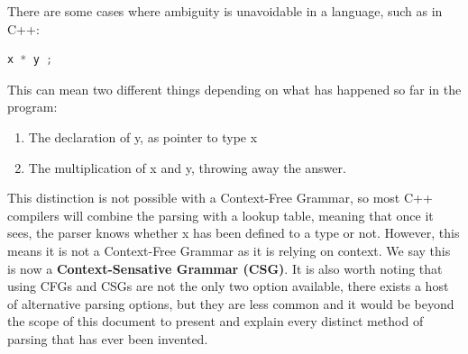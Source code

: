 \documentclass[ %
                    author={Jonathan Rankin},
                supervisor={Dr. David May, Dr. Ian Holyer},
                    degree={MEng},
                     title={CodeTouch},
                  subtitle={A Revolutionary Way To Program Real Code On Touch Screen Devices},
                      type={enterprise},
                      year={2015 } ]{dissertation}
\begin{document}
There are some cases where ambiguity is unavoidable in a language, such as in C++:

\begin{lstlisting}[language=Java]
    x * y ;
\end{lstlisting}

This can mean two different things depending on what has happened so far in the program:
\begin{enumerate}

\item The declaration of y, as pointer to type x
\item The multiplication of x and y, throwing away the answer.

\end{enumerate}

This distinction is not possible with a Context-Free Grammar, so most C++ compilers will combine the parsing with a lookup table, meaning  that once it sees, the parser knows whether x has been defined to a type or not. However, this means it is not a Context-Free Grammar as it is relying on context. We say this is now a \textbf{Context-Sensative Grammar (CSG)}. It is also worth noting that using CFGs and CSGs are not the only two option available, there exists a host of alternative parsing options, but they are less common and it would be beyond the scope of this document to present and explain every distinct method of parsing that has ever been invented. 
\end{document}
